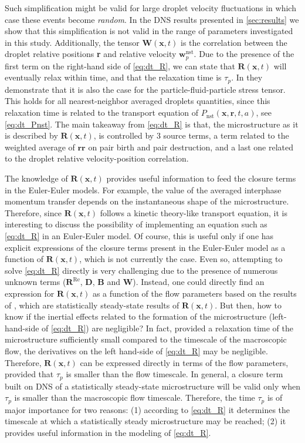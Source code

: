 Such simplification might be valid for large  droplet velocity fluctuations in which case these events become \textit{random}.
In the DNS results presented in \ref{sec:results} we show that this simplification is not valid in the range of parameters investigated in this study.
Additionally, the tensor $\textbf{W}(\textbf{x},t)$ is the correlation between the droplet relative positions \textbf{r} and relative velocity $\textbf{w}_p^\text{nst}$.
Due to the presence of the first term on the right-hand side of \ref{eq:dt_R}, we can state that $\textbf{R}(\textbf{x},t)$ will eventually relax within time, and that the relaxation time is $\tau_p$. 
In \citet{zhang2023evolution} they demonstrate that it is also the case for the particle-fluid-particle stress tensor.
This holds for all nearest-neighbor averaged droplets quantities, since this relaxation time is related to the transport equation of $P_\text{nst}(\textbf{x},\textbf{r},t,a)$, see \ref{eq:dt_Pnst}.
The main takeaway from \ref{eq:dt_R} is that, the microstructure as it is described by $\textbf{R}(\textbf{x},t)$, is controlled by 3 source terms, a term related to the weighted average of $\textbf{rr}$ on pair birth and pair destruction, and a last one related to the droplet relative velocity-position correlation. 


The knowledge of $\textbf{R}(\textbf{x},t)$ provides useful information to feed the closure terms in the Euler-Euler models.
For example, the value of the averaged interphase momentum transfer depends on the instantaneous shape of the microstructure. 
Therefore, since $\textbf{R}(\textbf{x},t)$ follows a kinetic theory-like transport equation, it is interesting to discuss the possibility of implementing an equation such as \ref{eq:dt_R} in an Euler-Euler model. 
Of course, this is useful only if one has explicit expressions of the closure terms present in the Euler-Euler model as a function of $\textbf{R}(\textbf{x},t)$, which is not currently the case.
Even so, attempting to solve \ref{eq:dt_R} directly is very challenging due to the presence of numerous unknown terms ($\textbf{R}^\text{Re}$, $\textbf{D}$, $\textbf{B}$ and $\textbf{W}$).
Instead, one could directly find an expression for $\textbf{R}(\textbf{x},t)$ as a function of the flow parameters based on the results of \citet{fintzi2024buoyancy}, which are statistically steady-state results of $\textbf{R}(\textbf{x},t)$. 
But then, how to know if the inertial effects related to the formation of the microstructure  (left-hand-side of \ref{eq:dt_R}) are negligible?
In fact, provided a relaxation time of the microstructure sufficiently small compared to the timescale of the macroscopic flow, the derivatives on the left hand-side of \ref{eq:dt_R} may be negligible.
Therefore, $\textbf{R}(\textbf{x},t)$ can be expressed directly in terms of the flow parameters, provided that $\tau_p$ is smaller than the flow timescale. 
In general, a closure term built on DNS of a  statistically steady-state microstructure will be valid only when $\tau_p$ is smaller than the macroscopic flow timescale. 
Therefore, the time $\tau_p$ is of major importance for two reasons: 
(1) according to \ref{eq:dt_R} it determines the timescale at which a statistically steady microstructure may be reached; 
(2) it provides useful information in the modeling of \ref{eq:dt_R}.


